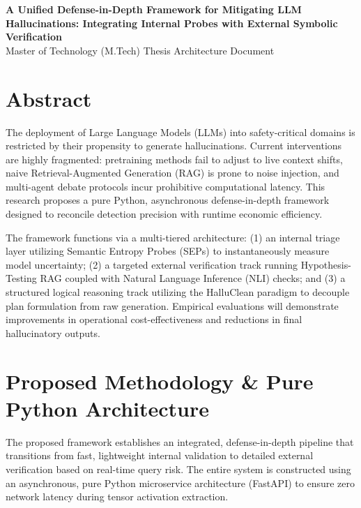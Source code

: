 \documentclass[11pt,a4paper]{article}
\begin{document}
\begin{center}
    {\LARGE \textbf{\color{DeepNavy}A Unified Defense-in-Depth Framework for Mitigating LLM Hallucinations: Integrating Internal Probes with External Symbolic Verification}}\\[1.5cm]
    {\Large Master of Technology (M.Tech) Thesis Architecture Document}\\[1cm]
\end{center}


\section{Abstract}
The deployment of Large Language Models (LLMs) into safety-critical domains is restricted by their propensity to generate hallucinations. Current interventions are highly fragmented: pretraining methods fail to adjust to live context shifts, naive Retrieval-Augmented Generation (RAG) is prone to noise injection, and multi-agent debate protocols incur prohibitive computational latency. This research proposes a pure Python, asynchronous defense-in-depth framework designed to reconcile detection precision with runtime economic efficiency. 

The framework functions via a multi-tiered architecture: (1) an internal triage layer utilizing Semantic Entropy Probes (SEPs) to instantaneously measure model uncertainty; (2) a targeted external verification track running Hypothesis-Testing RAG coupled with Natural Language Inference (NLI) checks; and (3) a structured logical reasoning track utilizing the HalluClean paradigm to decouple plan formulation from raw generation. Empirical evaluations will demonstrate improvements in operational cost-effectiveness and reductions in final hallucinatory outputs.

\section{Proposed Methodology \& Pure Python Architecture}
The proposed framework establishes an integrated, defense-in-depth pipeline that transitions from fast, lightweight internal validation to detailed external verification based on real-time query risk. The entire system is constructed using an asynchronous, pure Python microservice architecture (FastAPI) to ensure zero network latency during tensor activation extraction.
\end{document}

